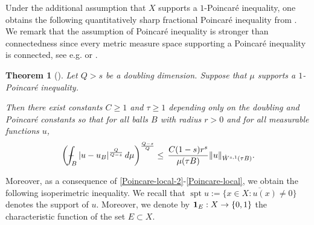 \documentclass[11pt,leqno]{amsart}
\def\Xint#1{\mathchoice
	{\XXint\displaystyle\textstyle{#1}}
	{\XXint\textstyle\scriptstyle{#1}}
	{\XXint\scriptstyle\scriptscriptstyle{#1}}
	{\XXint\scriptscriptstyle\scriptscriptstyle{#1}}
	\!\int}
\def\XXint#1#2#3{{\setbox0=\hbox{$#1{#2#3}{\int}$ }
		\vcenter{\hbox{$#2#3$ }}\kern-.6\wd0}}
\def\dashint{\Xint-}
\newtheorem{theorem}{Theorem}[section]
\numberwithin{equation}{section}
\theoremstyle{definition}
\DeclareMathOperator{\supp}{spt}
\begin{document}
	Under the additional assumption that $X$ supports a $1$-Poincar\'e inequality, one obtains the following quantitatively sharp fractional Poincar\'e inequality  from \cite{KLLZ25}. We remark that the assumption of Poincar\'e inequality is stronger than connectedness since every metric measure space supporting  a Poincar\'e inequality is connected, see e.g. \cite[Section 4.5]{BB11} or \cite[Section 8]{HKST15}.
	
	\begin{theorem}[{\cite[Theorem 1.1]{KLLZ25}}]
		Let $Q>s$ be a doubling dimension. Suppose that $\mu$ supports a $1$-Poincar\'e inequality.
		
		Then there exist  constants $C\ge 1$ and $\tau\ge 1$ depending only on the doubling and Poincar\'e constants so that for all balls $B$ with radius $r>0$ and for all measurable functions $u$, 
		\begin{align}
			\, \left(\dashint_{B}|u-u_{B}|^{\frac{Q}{Q-s}} \,d\mu\right)^{\frac{Q-s}{Q}} 
			\leq\,  \frac{C(1-s)r^s}{\mu(\tau B)} \|u\|_{\dot W^{s,1}(\tau B)}.
			\label{Poincare-local}
		\end{align}
	\end{theorem}
	
	
	
	Moreover, as a consequence of \eqref{Poincare-local-2}-\eqref{Poincare-local},
	we obtain the following isoperimetric inequality.
	We recall that $\supp u:=\overline{\{x\in X: u(x)\neq 0\}}$
	denotes the support of $u$.
	Moreover, we denote by ${\bf 1}_E:X\to \{0,1\}$ the characteristic function of the set $E\subset X$. 
	
\end{document}
